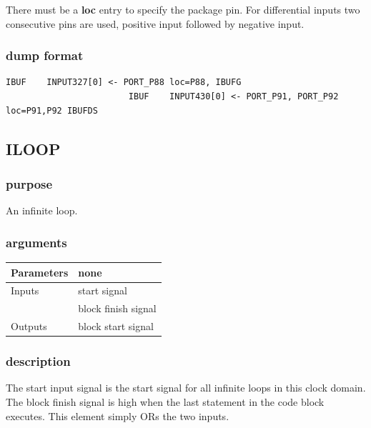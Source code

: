 \documentclass[10pt,a4paper,twoside,fleqn]{book}
\begin{document}
                    There must be a {\bf loc} entry to specify the package pin.
                    For differential inputs two consecutive pins are used,
                    positive input followed by negative input.
 
                \subsubsection{dump format}

                    \begin{lstlisting}[gobble=20, language=tde]
                        IBUF    INPUT327[0] <- PORT_P88 loc=P88, IBUFG
                        IBUF    INPUT430[0] <- PORT_P91, PORT_P92 loc=P91,P92 IBUFDS
                    \end{lstlisting}


            \subsection{ILOOP}

                \subsubsection{purpose}

                    An infinite loop.

                \subsubsection{arguments}

                    \begin{tabular}{| l | l |}
                    \hline
                    Parameters  & none \\
                    \hline
                    Inputs      & start signal \\
                                & block finish signal \\
                    \hline
                    Outputs     & block start signal \\
                    \hline
                    \end{tabular}

                \subsubsection{description}

                    The start input signal is the start signal for all infinite
                    loops in this clock domain. The block finish signal is high when
                    the last statement in the code block executes. This element
                    simply ORs the two inputs.
\end{document}
